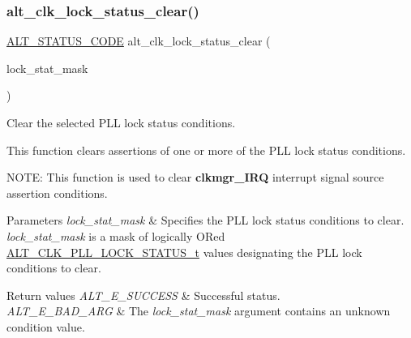 \subsubsection{\texorpdfstring{alt\_clk\_lock\_status\_clear()}{alt\_clk\_lock\_status\_clear()}}
{\footnotesize\ttfamily \mbox{\hyperlink{hwlib_8h_abdb0d369f069723ca55d6c94bcaaaa12}{A\+L\+T\+\_\+\+S\+T\+A\+T\+U\+S\+\_\+\+C\+O\+DE}} alt\+\_\+clk\+\_\+lock\+\_\+status\+\_\+clear (\begin{DoxyParamCaption}\item[{\mbox{\hyperlink{group__CLK__MGR__STATUS_ga62fbfc277685cad341f57ee0a252092c}{A\+L\+T\+\_\+\+C\+L\+K\+\_\+\+P\+L\+L\+\_\+\+L\+O\+C\+K\+\_\+\+S\+T\+A\+T\+U\+S\+\_\+t}}}]{lock\+\_\+stat\+\_\+mask }\end{DoxyParamCaption})}

Clear the selected P\+LL lock status conditions.

This function clears assertions of one or more of the P\+LL lock status conditions.

N\+O\+TE\+: This function is used to clear {\bfseries{clkmgr\+\_\+\+I\+RQ}} interrupt signal source assertion conditions.


\begin{DoxyParams}{Parameters}
{\em lock\+\_\+stat\+\_\+mask} & Specifies the P\+LL lock status conditions to clear. {\itshape lock\+\_\+stat\+\_\+mask} is a mask of logically OR\textquotesingle{}ed \mbox{\hyperlink{group__CLK__MGR__STATUS_ga62fbfc277685cad341f57ee0a252092c}{A\+L\+T\+\_\+\+C\+L\+K\+\_\+\+P\+L\+L\+\_\+\+L\+O\+C\+K\+\_\+\+S\+T\+A\+T\+U\+S\+\_\+t}} values designating the P\+LL lock conditions to clear.\\
\hline
\end{DoxyParams}

\begin{DoxyRetVals}{Return values}
{\em A\+L\+T\+\_\+\+E\+\_\+\+S\+U\+C\+C\+E\+SS} & Successful status. \\
\hline
{\em A\+L\+T\+\_\+\+E\+\_\+\+B\+A\+D\+\_\+\+A\+RG} & The {\itshape lock\+\_\+stat\+\_\+mask} argument contains an unknown condition value. \\
\hline
\end{DoxyRetVals}
\mbox{\label{group__CLK__MGR__STATUS_gad22a977022a50a543770201166ed9e24}} 
